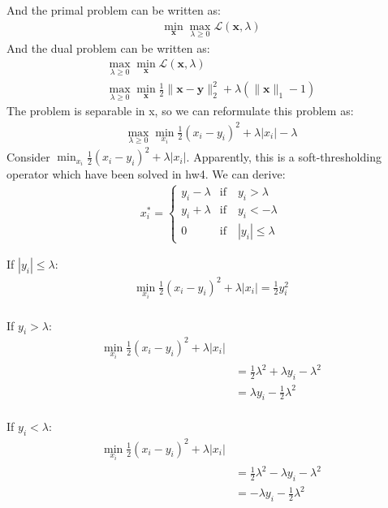 \documentclass[12pt]{article}
\begin{document}
And the primal problem can be written as:
\begin{align*}
    \min_{\bm{x}} \max_{\lambda \geq 0} \mathcal{L}(\bm{x}, \lambda)
\end{align*}
And the dual problem can be written as:
\begin{align*}
    \max_{\lambda \geq 0} \min_{\bm{x}} \mathcal{L}(\bm{x}, \lambda) \\
    \max_{\lambda \geq 0} \min_{\bm{x}} \frac{1}{2} \|\bm{x} - \bm{y}\|_2^2 + \lambda(\|\bm{x}\|_1 - 1)
\end{align*}
The problem is separable in x, so we can reformulate this problem as:
\begin{align*}
    \max_{\lambda \geq 0} \min_{x_i} \frac{1}{2} (x_i - y_i)^2 + \lambda|x_i| - \lambda
\end{align*}
Consider \(\min_{x_i} \frac{1}{2} (x_i - y_i)^2 + \lambda|x_i|\).
Apparently, this is a soft-thresholding operator which have been solved in hw4. We can derive:
\begin{align*}
    x_i^* = \begin{cases}
        y_i - \lambda &\text{if}\quad y_i > \lambda \\
        y_i + \lambda &\text{if}\quad y_i < -\lambda \\
        0             &\text{if}\quad |y_i| \leq \lambda
    \end{cases}
\end{align*}

If \(|y_i| \leq \lambda\):
\begin{align*}
    \min_{x_i} \frac{1}{2} (x_i - y_i)^2 + \lambda|x_i| = \frac{1}{2} y_i^2 \\
\end{align*}

If \(y_i > \lambda\):
\begin{align*}
    \min_{x_i} \frac{1}{2} (x_i - y_i)^2 + \lambda|x_i|&\\
    &= \frac{1}{2} \lambda^2 + \lambda y_i - \lambda^2  \\
    &= \lambda y_i - \frac{1}{2} \lambda^2\\
\end{align*}


If \(y_i < \lambda\):
\begin{align*}
    \min_{x_i} \frac{1}{2} (x_i - y_i)^2 + \lambda|x_i|&\\
    &= \frac{1}{2} \lambda^2 - \lambda y_i - \lambda^2  \\
    &= -\lambda y_i - \frac{1}{2} \lambda^2\\
\end{align*}
\end{document}
